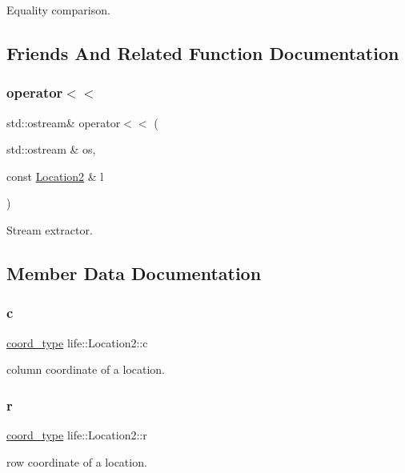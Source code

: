 Equality comparison. 



\subsection{Friends And Related Function Documentation}
\mbox{\label{structlife_1_1_location2_a44085618a718042868c38885bbde7fa8}} 
\subsubsection{\texorpdfstring{operator$<$$<$}{operator<<}}
{\footnotesize\ttfamily std\+::ostream\& operator$<$$<$ (\begin{DoxyParamCaption}\item[{std\+::ostream \&}]{os,  }\item[{const \mbox{\hyperlink{structlife_1_1_location2}{Location2}} \&}]{l }\end{DoxyParamCaption})\hspace{0.3cm}{\ttfamily [friend]}}



Stream extractor. 



\subsection{Member Data Documentation}
\mbox{\label{structlife_1_1_location2_a00720fe856afcb622f5393ba72770a5c}} 
\subsubsection{\texorpdfstring{c}{c}}
{\footnotesize\ttfamily \mbox{\hyperlink{structlife_1_1_location2_abad0c81db789cf9a9f4396ac0c0ef06b}{coord\+\_\+type}} life\+::\+Location2\+::c}

column coordinate of a location. \mbox{\label{structlife_1_1_location2_a30da62b5cddae401fdbc16546cf8806e}} 
\subsubsection{\texorpdfstring{r}{r}}
{\footnotesize\ttfamily \mbox{\hyperlink{structlife_1_1_location2_abad0c81db789cf9a9f4396ac0c0ef06b}{coord\+\_\+type}} life\+::\+Location2\+::r}



row coordinate of a location. 

